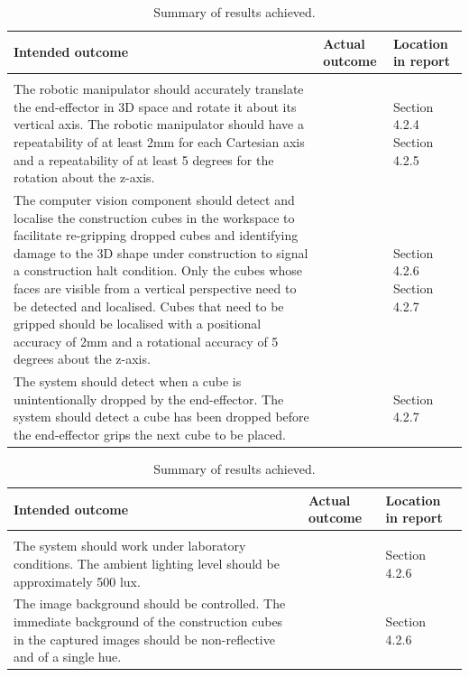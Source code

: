 \begin{table}[H]
	\renewcommand{\arraystretch}{1.3}
	\centering
	\begin{tabular}{|>{\raggedright}m{6.5cm}|>{\raggedright}m{5cm}|>{\raggedright\arraybackslash}m{2.2cm}|}
		\hline
		\textbf{Intended outcome} & \textbf{Actual outcome} & \textbf{Location in report} \\
		\hline
		\multicolumn{3}{|l|}{\textbf{Core mission requirements and specifications}} \\
		\hline
		The robotic manipulator should accurately translate the end-effector in 3D space and rotate it about its vertical axis. The robotic manipulator should have a repeatability of at least 2mm for each Cartesian axis and a repeatability of at least 5 degrees for the rotation about the z-axis. & & Section 4.2.4 Section 4.2.5 \\
		\hline
		The computer vision component should detect and localise the construction cubes in the workspace to facilitate re-gripping dropped cubes and identifying damage to the 3D shape under construction to signal a construction halt condition. Only the cubes whose faces are visible from a vertical perspective need to be detected and localised. Cubes that need to be gripped should be localised with a positional accuracy of 2mm and a rotational accuracy of 5 degrees about the z-axis. & & Section 4.2.6 Section 4.2.7 \\
		\hline
		The system should detect when a cube is unintentionally dropped by the end-effector. The system should detect a cube has been dropped before the end-effector grips the next cube to be placed. & & Section 4.2.7 \\
		\hline
	\end{tabular}
	\caption{\label{tab:results_summary_p2}Summary of results achieved.}
\end{table}

\begin{table}[H]
	\renewcommand{\arraystretch}{1.3}
	\centering
	\begin{tabular}{|>{\raggedright}m{6.5cm}|>{\raggedright}m{5cm}|>{\raggedright\arraybackslash}m{2.2cm}|}
		\hline
		\textbf{Intended outcome} & \textbf{Actual outcome} & \textbf{Location in report} \\
		\hline
		\multicolumn{3}{|l|}{\textbf{Field condition requirements and specifications}} \\
		\hline
		The system should work under laboratory conditions. The ambient lighting level should be approximately 500 lux. & & Section 4.2.6 \\
		\hline
		The image background should be controlled. The immediate background of the construction cubes in the captured images should be non-reflective and of a single hue.& & Section 4.2.6 \\
		\hline
	\end{tabular}
	\caption{\label{tab:results_summary_p3}Summary of results achieved.}
\end{table}

